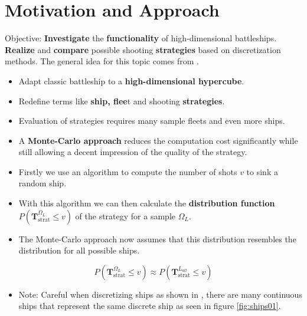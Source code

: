 \documentclass[final,hyperref={pdfpagelabels=false},table]{beamer}
\begin{document}
\begin{frame}
\centering
\begin{columns}[T]
\begin{column}{\colCWidth}


\justifying
\section{Motivation and Approach}
Objective: \textbf{Investigate} the \textbf{functionality} of high-dimensional battleships. \textbf{Realize} and \textbf{compare} possible shooting \textbf{strategies} based on discretization methods. The general idea for this topic comes from \cite{MF}.
\begin{itemize} 
\item Adapt classic battleship to a \textbf{high-dimensional hypercube}.
\item Redefine terms like \textbf{ship, flee}t and shooting \textbf{strategies}.
\item Evaluation of strategies requires many sample fleets and even more ships.
\item A \textbf{Monte-Carlo approach} reduces the computation cost significantly while still allowing a decent impression of the quality of the strategy.
\item Firstly we use an algorithm to compute the number of shots $v$ to sink a random ship.
\item With this algorithm we can then calculate the \textbf{distribution function} $P(\mathbf{T}^{\Omega_L}_{\text{strat}} \leq v)$ of the strategy for a sample $\Omega_L$.
\item The Monte-Carlo approach now assumes that this distribution resembles the distribution for all possible ships.
\end{itemize}

\begin{equation}
	P(\mathbf{T}^{\Omega_L}_{\text{strat}} \leq v) \approx P(\mathbf{T}^{L_{all}}_{\text{strat}} \leq v)
\end{equation}

\begin{itemize}
	\item Note: Careful when discretizing ships as shown in \cite{MF}, there are many continuous ships that represent the same discrete ship as seen in figure \ref{fig:ships01}.
\end{itemize}


\end{column}
\end{columns}
\end{frame}
\end{document}
